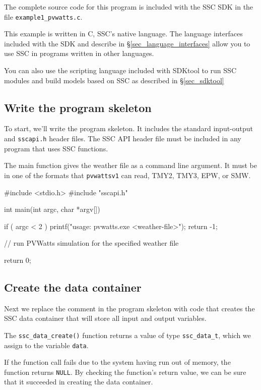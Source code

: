 \documentclass{scrartcl} %
\begin{document}
The complete source code for this program is included with the SSC SDK in the file \texttt{example1\_pvwatts.c}.

This example is written in C, SSC's native language. The language interfaces included with the SDK and describe in \S\ref{sec_language_interfaces} allow you to use SSC in programs written in other languages.

You can also use the scripting language included with SDKtool to run SSC modules and build models based on SSC as described in \S\ref{sec_sdktool}

\subsection{Write the program skeleton}

To start, we'll write the program skeleton. It includes the standard input-output and  \texttt{sscapi.h} header files. The SSC API header file must be included in any program that uses SSC functions.

The main function gives the weather file as a command line argument. It must be in one of the formats that \texttt{pvwattsv1} can read,  TMY2, TMY3, EPW, or SMW.

\begin{verbatimtab}[4]
#include <stdio.h>
#include "sscapi.h"

int main(int argc, char *argv[])
{
	if ( argc < 2 )
	{
		printf("usage: pvwatts.exe <weather-file>\n");
		return -1;
	}
 
	// run PVWatts simulation for the specified weather file
	
	return 0;
}
\end{verbatimtab}

\subsection{Create the data container}

Next we replace the comment in the program skeleton with code that creates the SSC data container that will store all input and output variables.
 
The \texttt{ssc\_data\_create()} function returns a value of type \texttt{ssc\_data\_t}, which we assign to the variable \texttt{data}.

If the function call fails due to the system having run out of memory, the function returns \texttt{NULL}. By checking the function's return value, we can be sure that it succeeded in creating the data container.
\end{document}
